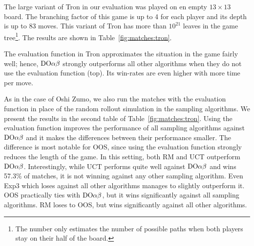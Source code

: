 The large variant of Tron in our evaluation was played on en empty $13\times 13$ board. The branching factor of this game is up to 4 for each player and its depth is up to 83 moves. This variant of Tron has more than $10^{21}$ leaves in the game tree\footnote{The number only estimates the number of possible paths when both players stay on their half of the board.}.
The results are shown in Table~\ref{fig:matches:tron}.

The evaluation function in Tron approximates the situation in the game fairly well; hence, $\textrm{DO}\alpha\beta$ strongly outperforms all other algorithms when they do not use the evaluation function (top). Its win-rates are even higher with more time per move.


As in the case of Oshi Zumo, we also run the matches with the evaluation function in place of the random rollout simulation in the sampling algorithms.
We present the results in the second table of Table~\ref{fig:matches:tron}.
Using the evaluation function improves the performance of all sampling algorithms against $\textrm{DO}\alpha\beta$ and it makes the differences between their performance smaller.
The difference is most notable for OOS, since using the evaluation function strongly reduces the length of the game.
In this setting, both RM and UCT outperform $\textrm{DO}\alpha\beta$. 
Interestingly, while UCT performs quite well against $\textrm{DO}\alpha\beta$ and wins 57.3\% of matches, it is not winning against any other sampling algorithm. 
Even Exp3 which loses against all other algorithms manages to slightly outperform it.
OOS practically ties with $\textrm{DO}\alpha\beta$, but it wins significantly against all sampling algorithms.
RM loses to OOS, but wins significantly against all other algorithms.

